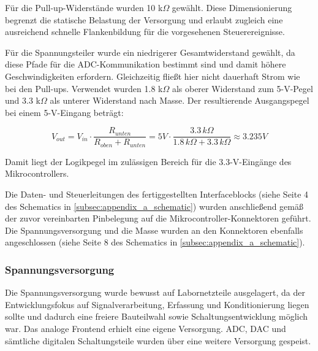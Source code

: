 \documentclass[a4paper, portrait, 12pt]{scrartcl} %
\begin{document}
Für die Pull-up-Widerstände wurden 10 k$\Omega$ gewählt. Diese Dimensionierung begrenzt die statische Belastung der Versorgung und erlaubt zugleich eine ausreichend schnelle Flankenbildung für die vorgesehenen Steuerereignisse.

Für die Spannungsteiler wurde ein niedrigerer Gesamtwiderstand gewählt, da diese Pfade für die ADC-Kommunikation bestimmt sind und damit höhere Geschwindigkeiten erfordern. Gleichzeitig fließt hier nicht dauerhaft Strom wie bei den Pull-ups. Verwendet wurden 1.8 k$\Omega$ als oberer Widerstand zum 5-V-Pegel und 3.3 k$\Omega$ als unterer Widerstand nach Masse. Der resultierende Ausgangspegel bei einem 5-V-Eingang beträgt:

\[
V_{out} = V_{in} \cdot \frac{R_{unten}}{R_{oben} + R_{unten}} = 5 V \cdot \frac{3.3\,k\Omega}{1.8\,k\Omega + 3.3\,k\Omega} \approx 3.235 V
\]

Damit liegt der Logikpegel im zulässigen Bereich für die 3.3-V-Eingänge des Mikrocontrollers.

Die Daten- und Steuerleitungen des fertiggestellten Interfaceblocks (siehe Seite 4 des Schematics in \autoref{subsec:appendix_a_schematic}) wurden anschließend gemäß der zuvor vereinbarten Pinbelegung auf die Mikrocontroller-Konnektoren geführt. Die Spannungsversorgung und die Masse wurden an den Konnektoren ebenfalls angeschlossen (siehe Seite 8 des Schematics in \autoref{subsec:appendix_a_schematic}).


\subsubsection{Spannungsversorgung}

Die Spannungsversorgung wurde bewusst auf Labornetzteile ausgelagert, da der Entwicklungsfokus auf Signalverarbeitung, Erfassung und Konditionierung liegen sollte und dadurch eine freiere Bauteilwahl sowie Schaltungsentwicklung möglich war. Das analoge Frontend erhielt eine eigene Versorgung. ADC, DAC und sämtliche digitalen Schaltungsteile wurden über eine weitere Versorgung gespeist. \\
\end{document}
